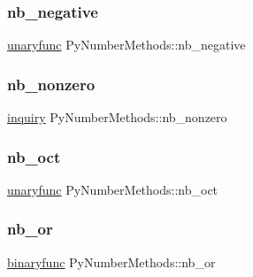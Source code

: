 \mbox{\label{struct_py_number_methods_a0a4cb6e0aa1d4f2846ad198931c53af0}} 
\subsubsection{\texorpdfstring{nb\_negative}{nb\_negative}}
{\footnotesize\ttfamily \mbox{\hyperlink{_python27_2object_8h_aeda2d77a292fdf2c686151d24b3dbf5a}{unaryfunc}} Py\+Number\+Methods\+::nb\+\_\+negative}

\mbox{\label{struct_py_number_methods_a427a1ff2af26084482459cc7c007ce9d}} 
\subsubsection{\texorpdfstring{nb\_nonzero}{nb\_nonzero}}
{\footnotesize\ttfamily \mbox{\hyperlink{_python27_2object_8h_a2614f58e24895fe4693c83466d7f46e8}{inquiry}} Py\+Number\+Methods\+::nb\+\_\+nonzero}

\mbox{\label{struct_py_number_methods_ab78c4310b03d60c2670f03f7452383f8}} 
\subsubsection{\texorpdfstring{nb\_oct}{nb\_oct}}
{\footnotesize\ttfamily \mbox{\hyperlink{_python27_2object_8h_aeda2d77a292fdf2c686151d24b3dbf5a}{unaryfunc}} Py\+Number\+Methods\+::nb\+\_\+oct}

\mbox{\label{struct_py_number_methods_acc4e4256e1d46b983c3e22609cf4e7ff}} 
\subsubsection{\texorpdfstring{nb\_or}{nb\_or}}
{\footnotesize\ttfamily \mbox{\hyperlink{_python27_2object_8h_a1a50b2d154f36acb9d215f2cdc1561a8}{binaryfunc}} Py\+Number\+Methods\+::nb\+\_\+or}

